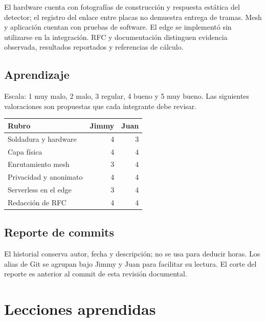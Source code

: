 \documentclass[11pt,letterpaper]{article}
\begin{document}
El hardware cuenta con fotografías de construcción y respuesta estática del
detector; el registro del enlace entre placas no demuestra entrega de tramas.
Mesh y aplicación cuentan con pruebas de software. El edge se implementó sin
utilizarse en la integración. RFC y documentación distinguen evidencia observada,
resultados reportados y referencias de cálculo.

\subsection{Aprendizaje}

Escala: 1 muy malo, 2 malo, 3 regular, 4 bueno y 5 muy bueno. Las siguientes
valoraciones son propuestas que cada integrante debe revisar.

{\small
\begin{tabularx}{\linewidth}{X r r}
\toprule
Rubro & Jimmy & Juan\\
\midrule
Soldadura y hardware & 4 & 3\\
Capa física & 4 & 4\\
Enrutamiento mesh & 3 & 4\\
Privacidad y anonimato & 4 & 4\\
Serverless en el edge & 3 & 4\\
Redacción de RFC & 4 & 4\\
\bottomrule
\end{tabularx}}

\subsection{Reporte de commits}

El historial conserva autor, fecha y descripción; no se usa para deducir horas.
Los alias de Git se agrupan bajo Jimmy y Juan para facilitar su lectura. El
corte del reporte es anterior al commit de esta revisión documental.



\section{Lecciones aprendidas}
\end{document}
